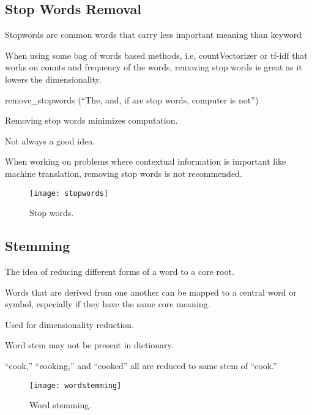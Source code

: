 	\subsection{Stop Words Removal}
	\begin{bulletedlist}
		\item Stopwords are common words that carry less important meaning than keyword
		\item When using some bag of words based methods, i.e, countVectorizer or tf-idf that works on counts and frequency of the words, removing stop words is great as it lowers the dimensionality.
		\begin{bulletedlist}
			\item remove\_stopwords (``The, and, if are stop words, computer is not'')
			\item Removing stop words minimizes computation.
		\end{bulletedlist}
		\item Not always a good idea.
		\begin{bulletedlist}
			\item When working on problems where contextual information is important like machine translation, removing stop words is not
recommended.
		\end{bulletedlist}
	\end{bulletedlist}

	\begin{figure}[h]
		\centering
		\texttt{[image: stopwords]}
		\caption[Stop words]{Stop words.}
		\label{fig:stopwords}
	\end{figure}


	\subsection{Stemming}
	\begin{bulletedlist}
		\item The idea of reducing different forms of a word to a core root.
		\item Words that are derived from one another can be mapped to a central word or symbol, especially if they have the same
core meaning.
		\item Used for dimensionality reduction.
		\item Word stem may not be present in dictionary.
		\item ``cook,'' ``cooking,'' and ``cooked'' all are reduced to same stem of ``cook.''
	\end{bulletedlist}

	\begin{figure}[h]
		\centering
		\texttt{[image: wordstemming]}
		\caption[Word stemming]{Word stemming.}
		\label{fig:wordstemming}
	\end{figure}


